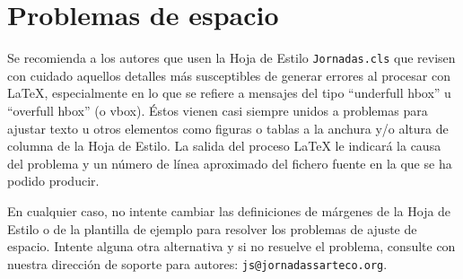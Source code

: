 \section{Problemas de espacio}

Se recomienda a los autores que usen la Hoja de Estilo {\tt Jornadas.cls} que
revisen con cuidado aquellos detalles más susceptibles de generar errores al
procesar con \LaTeX, especialmente en lo que se refiere a mensajes del tipo
``underfull hbox'' u ``overfull hbox'' (o vbox). Éstos vienen casi siempre
unidos a problemas para ajustar texto u otros elementos como figuras o tablas a
la anchura y/o altura de columna de la Hoja de Estilo. La salida del proceso
\LaTeX{} le indicará la causa del problema y un número de línea aproximado del
fichero fuente en la que se ha podido producir.

En cualquier caso, no intente cambiar las definiciones de márgenes de la Hoja de
Estilo o de la plantilla de ejemplo para resolver los problemas de ajuste de
espacio. Intente alguna otra alternativa y si no resuelve el problema, consulte
con nuestra dirección de soporte para autores: {\tt js@jornadassarteco.org}.